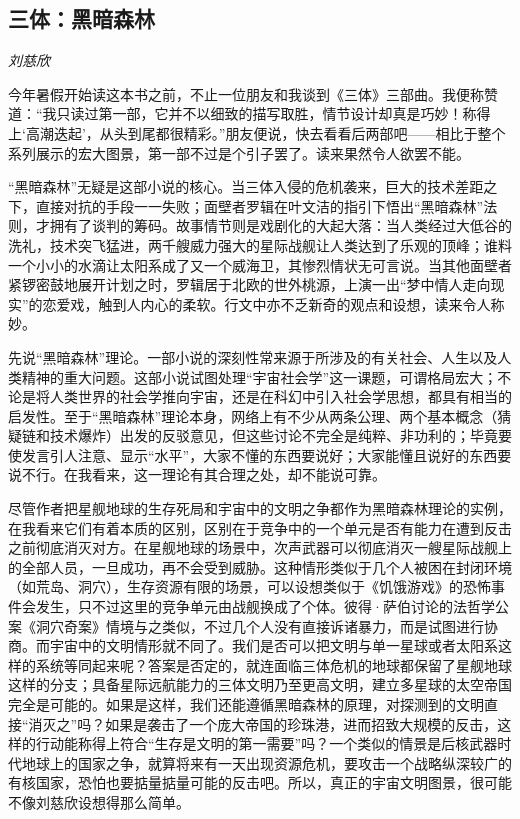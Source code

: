 \subsection*{三体：黑暗森林}
\par \emph{刘慈欣} 
\par 今年暑假开始读这本书之前，不止一位朋友和我谈到《三体》三部曲。我便称赞道：“我只读过第一部，它并不以细致的描写取胜，情节设计却真是巧妙！称得上‘高潮迭起’，从头到尾都很精彩。”朋友便说，快去看看后两部吧——相比于整个系列展示的宏大图景，第一部不过是个引子罢了。读来果然令人欲罢不能。
\par “黑暗森林”无疑是这部小说的核心。当三体入侵的危机袭来，巨大的技术差距之下，直接对抗的手段一一失败；面壁者罗辑在叶文洁的指引下悟出“黑暗森林”法则，才拥有了谈判的筹码。故事情节则是戏剧化的大起大落：当人类经过大低谷的洗礼，技术突飞猛进，两千艘威力强大的星际战舰让人类达到了乐观的顶峰；谁料一个小小的水滴让太阳系成了又一个威海卫，其惨烈情状无可言说。当其他面壁者紧锣密鼓地展开计划之时，罗辑居于北欧的世外桃源，上演一出“梦中情人走向现实”的恋爱戏，触到人内心的柔软。行文中亦不乏新奇的观点和设想，读来令人称妙。
\par 先说“黑暗森林”理论。一部小说的深刻性常来源于所涉及的有关社会、人生以及人类精神的重大问题。这部小说试图处理“宇宙社会学”这一课题，可谓格局宏大；不论是将人类世界的社会学推向宇宙，还是在科幻中引入社会学思想，都具有相当的启发性。至于“黑暗森林”理论本身，网络上有不少从两条公理、两个基本概念（猜疑链和技术爆炸）出发的反驳意见，但这些讨论不完全是纯粹、非功利的；毕竟要使发言引人注意、显示“水平”，大家不懂的东西要说好；大家能懂且说好的东西要说不行。在我看来，这一理论有其合理之处，却不能说可靠。
\par 尽管作者把星舰地球的生存死局和宇宙中的文明之争都作为黑暗森林理论的实例，在我看来它们有着本质的区别，区别在于竞争中的一个单元是否有能力在遭到反击之前彻底消灭对方。在星舰地球的场景中，次声武器可以彻底消灭一艘星际战舰上的全部人员，一旦成功，再不会受到威胁。这种情形类似于几个人被困在封闭环境（如荒岛、洞穴），生存资源有限的场景，可以设想类似于《饥饿游戏》的恐怖事件会发生，只不过这里的竞争单元由战舰换成了个体。彼得·萨伯讨论的法哲学公案《洞穴奇案》情境与之类似，不过几个人没有直接诉诸暴力，而是试图进行协商。而宇宙中的文明情形就不同了。我们是否可以把文明与单一星球或者太阳系这样的系统等同起来呢？答案是否定的，就连面临三体危机的地球都保留了星舰地球这样的分支；具备星际远航能力的三体文明乃至更高文明，建立多星球的太空帝国完全是可能的。如果是这样，我们还能遵循黑暗森林的原理，对探测到的文明直接“消灭之”吗？如果是袭击了一个庞大帝国的珍珠港，进而招致大规模的反击，这样的行动能称得上符合“生存是文明的第一需要”吗？一个类似的情景是后核武器时代地球上的国家之争，就算将来有一天出现资源危机，要攻击一个战略纵深较广的有核国家，恐怕也要掂量掂量可能的反击吧。所以，真正的宇宙文明图景，很可能不像刘慈欣设想得那么简单。
